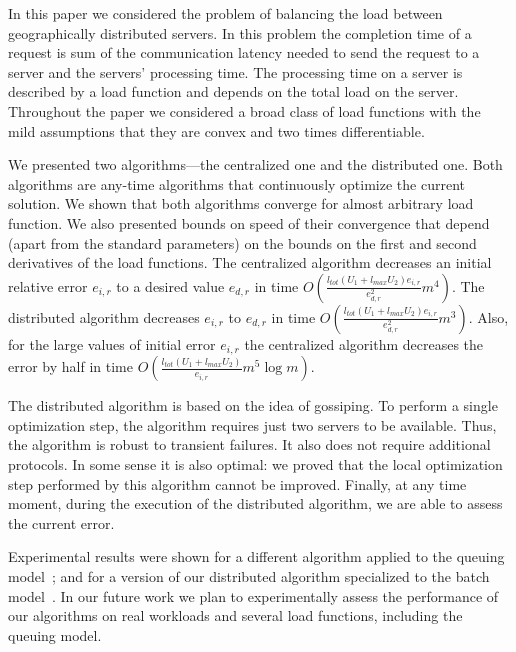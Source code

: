 \documentclass[11pt]{article}
\newcommand{\ltot}{{{l_{\mathit{tot}}}}}
\newcommand{\lmax}{{{l_{\mathit{max}}}}}
\begin{document}
In this paper we considered the problem of balancing the load between geographically distributed servers. In this problem the completion time of a request is sum of the 
communication latency needed to send the request to a server and the servers' processing time. The processing time on a server is described by a load function and depends on the total load on the server. Throughout the paper we considered a broad class of load functions with  the mild assumptions that they are convex and two times differentiable. 

We presented two algorithms---the centralized one and the distributed one. Both algorithms are any-time algorithms that continuously optimize the current solution. We shown that both algorithms converge for almost arbitrary load function. We also presented bounds on speed of their convergence that depend (apart from the standard parameters) on the bounds on the first and second derivatives of the load functions. The centralized algorithm decreases an initial relative error $e_{i, r}$ to a desired value  $e_{d, r}$ in time $O(\frac{\ltot(U_1 + \lmax U_2)e_{i, r}}{e_{d, r}^2}m^4)$. The distributed algorithm decreases $e_{i, r}$ to $e_{d, r}$ in time $O(\frac{\ltot (U_1 +\lmax U_2)e_{i, r}}{e_{d, r}^2}m^3)$. Also, for the large values of initial error $e_{i, r}$ the centralized algorithm decreases the error by half in time $O(\frac{\ltot (U_1 + \lmax U_2)}{e_{i, r}}m^5 \log m)$.

The distributed algorithm is based on the idea of gossiping. To perform a single optimization step, the algorithm requires just two servers to be available. Thus, the algorithm is robust to transient failures. It also does not require additional protocols. In some sense it is also optimal: we  proved that the local optimization step performed by this algorithm cannot be improved. Finally, at any time moment, during the execution of the distributed algorithm, we are able to assess the current error.

Experimental results were shown for a different algorithm applied to the queuing model~\cite{Liu:2011:GGL:1993744.1993767}; and for a version of our distributed algorithm specialized to the batch model~\cite{Skowron:2013:NDL:2510648.2510769}.
In our future work we plan to experimentally assess the performance of our algorithms on real workloads and several load functions, including the queuing model.











\end{document}
